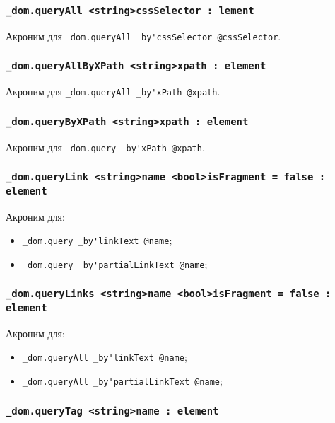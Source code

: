 \documentclass[a4paper, 14pt]{extarticle}
\newenvironment{icItems}
	{ \begin{itemize} [noitemsep,nolistsep] }
	{ \end{itemize} }
\begin{document}
\subsubsection{\lstinline|_dom.queryAll <string>cssSelector : lement|}

Акроним для \lstinline|_dom.queryAll _by'cssSelector @cssSelector|.

\subsubsection{\lstinline|_dom.queryAllByXPath <string>xpath : element|}

Акроним для \lstinline|_dom.queryAll _by'xPath @xpath|.

\subsubsection{\lstinline|_dom.queryByXPath <string>xpath : element|}

Акроним для \lstinline|_dom.query _by'xPath @xpath|.

\subsubsection{\lstinline|_dom.queryLink <string>name <bool>isFragment = false : element|}

Акроним для:
\begin{icItems}
	\item \lstinline|_dom.query _by'linkText @name|;
	\item \lstinline|_dom.query _by'partialLinkText @name|;
\end{icItems}

\subsubsection{\lstinline|_dom.queryLinks <string>name <bool>isFragment = false : element|}

Акроним для:
\begin{icItems}
	\item \lstinline|_dom.queryAll _by'linkText @name|;
	\item \lstinline|_dom.queryAll _by'partialLinkText @name|;
\end{icItems}

\subsubsection{\lstinline|_dom.queryTag <string>name : element|}
\end{document}
